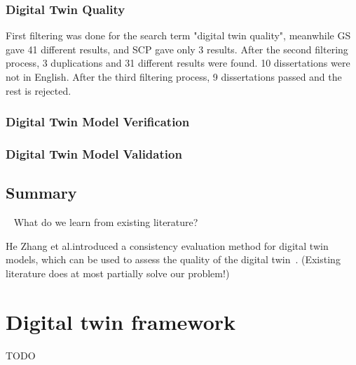 \documentclass[9pt,conference]{IEEEtran}
\begin{document}
    \subsubsection*{Digital Twin Quality}
    \label{subsection:DigitalTwinQuality}
    First filtering was done for the search term "digital twin quality", meanwhile GS gave 41 different results, and SCP gave only 3 results.
    After the second filtering process, 3 duplications and 31 different results were found. 10 dissertations were not in English.
    After the third filtering process, 9 dissertations passed and the rest is rejected.

    \subsubsection*{Digital Twin Model Verification}
    \label{subsection:DigitalTwinVerification}

    \subsubsection*{Digital Twin Model Validation}
    \label{subsection:DigitalTwinValidation}

    \subsection{Summary}~\label{section:liteature_summary}
    What do we learn from existing literature?

    He Zhang et al.introduced a consistency evaluation method for digital twin models, which can be used to assess the quality of the digital twin~\cite{ConsistencyEvolutionMethodForDigitalTwins}.
    (Existing literature does at most partially solve our problem!)

    \section{Digital twin framework}
    \label{section:framework_1}
    TODO
\end{document}
